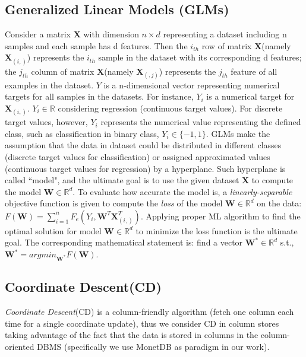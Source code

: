 \documentclass{vldb}
\begin{document}
\subsection{Generalized Linear Models (GLMs)}
Consider a matrix $\textbf{X}$ with dimension $n \times d$ representing a dataset including n samples
and each sample has d features. Then the $i_{th}$ row of matrix $\textbf{X}$(namely $\textbf{X}_{(i,)}$) represents the $i_{th}$
sample in the dataset with its corresponding d features; the $j_{th}$ column of matrix $\textbf{X}$(namely $\textbf{X}_{(,j)}$)
represents the $j_{th}$ feature of all examples in the dataset. $Y$ is a n-dimensional vector representing numerical
targets for all samples in the datasets. For instance, $Y_{i}$ is a numerical target for $\textbf{X}_{(i,)}$. $Y_{i} \in \mathbb{R}$ considering 
regression (continuous target values). For discrete target values, however, $Y_{i}$ represents the numerical value
representing the defined class, such as classification in binary class, $Y_{i}\in{\{-1,1\}}$.  GLMs make 
the assumption that the data in dataset could be distributed in different classes (discrete target values for classification) 
or assigned approximated values (continuous target values for regression) by a hyperplane. Such hyperplane is called 
``model", and the ultimate goal is to use the given dataset $\textbf{X}$ to compute the model $\textbf{W} \in \mathbb{R}^d$.
To evaluate how accurate the model is, a \textit{linearly-separable} objective function is given to compute the
\textit{loss} of the model $\textbf{W} \in \mathbb{R}^d$ on the data:
$F(\textbf{W}) = \sum_{i=1}^{n}{F_e(Y_i,  \textbf{W}^T\textbf{X}_{(i,)}^T)}$.
Applying proper ML algorithm to find the optimal solution for model $\textbf{W}\in \mathbb{R}^d$ to minimize the loss function
is the ultimate goal. The corresponding mathematical statement is:
find a vector $\textbf{W}^*\in \mathbb{R}^d$ s.t.,  $\textbf{W}^* = argmin_{\textbf{W}^*}F({\textbf{W}})$.

\subsection{Coordinate Descent(CD)}
\textit{Coordinate Descent}(CD)  is a column-friendly algorithm (fetch one column each time for a single coordinate update), thus we consider CD in 
column stores taking advantage of the fact that the data is stored in columns in the column-oriented DBMS (specifically we use MonetDB as paradigm in our work). 
\end{document}
